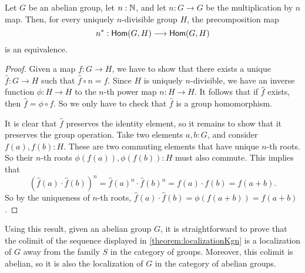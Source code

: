 \begin{prp}
    Let $G$ be an abelian group, let $n : \mathbb{N}$, and let $n : G \to G$ be the multiplication by $n$ map.
    Then, for every uniquely $n$-divisible group $H$, the precomposition map
    \[
        n^* : \mathsf{Hom}(G,H) \longrightarrow \mathsf{Hom}(G,H)
    \]
    is an equivalence.
\end{prp}

\begin{proof}
    Given a map $f : G \to H$, we have to show that there exists a unique $\hat{f} : G \to H$ such that
    $\hat{f} \circ n = f$.
    Since $H$ is uniquely $n$-divisible, we have an inverse function $\phi : H \to H$ to the $n$-th power map $n : H \to H$.
    It follows that if $\hat{f}$ exists, then $\hat{f} = \phi \circ f$.
    So we only have to check that $\hat{f}$ is a group homomorphism.

    It is clear that $\hat{f}$ preserves the identity element, so it remains to show that it preserves
    the group operation. Take two elements $a,b : G$, and consider $f(a),f(b) : H$. These are two commuting
    elements that have unique $n$-th roots. So their $n$-th roots $\phi(f(a)), \phi(f(b)) : H$ must also
    commute. This implies that
    \[
        (\hat{f}(a) \cdot \hat{f}(b))^n = \hat{f}(a)^n \cdot \hat{f}(b)^n = f(a) \cdot f(b) = f(a + b) .
    \]
    So by the uniqueness of $n$-th roots, $\hat{f}(a) \cdot \hat{f}(b) = \phi(f(a + b)) = \hat{f}(a+b)$.
\end{proof}

Using this result, given an abelian group $G$,
it is straightforward to prove that the colimit of the sequence displayed in
\cref{theorem:localizationKgn} is a localization of $G$ away from the family $S$
in the category of groups.
Moreover, this colimit is abelian, so it is also the localization of $G$
in the category of abelian groups.
